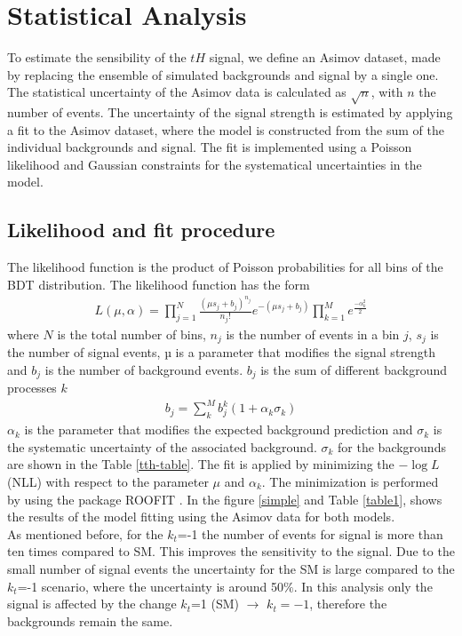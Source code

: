 \chapter{Statistical Analysis}
	To estimate the sensibility of the $tH$ signal, we define an Asimov dataset, made by replacing the ensemble of simulated backgrounds and signal by a single one. The statistical uncertainty of the Asimov data is calculated as $\sqrt{n}$, with $n$ the number of events. The uncertainty of the signal strength is estimated by applying a  fit to the Asimov dataset, where the model
	is constructed from the sum of the individual backgrounds and signal. The fit is implemented using a Poisson likelihood and Gaussian constraints for the systematical uncertainties in the model.
	
	
	\section{Likelihood and fit procedure}
	The likelihood function is the product of Poisson probabilities for all bins of the BDT distribution. The likelihood function has the form
	\begin{align}
		L(\mu,\alpha)=\prod_{j=1}^{N}\frac{(\mu s_j +b_j)^{n_j}}{n_j !}e^{-(\mu s_j+b_j)} \prod_{k=1}^M e^{\frac{-\alpha^2_k}{2}}
	\end{align}
	where $N$ is the total number of bins, $n_j$ is the number of events in a bin $j$,  $s_j$ is the number of signal events, µ is a parameter that modifies the signal strength and  $b_j$ is the number of background events.
	$b_j$ is the sum of different background processes $k$
	\begin{align}
		b_j=\sum_k^M b_j^k(1+ \alpha_k \sigma_k)
	\end{align}
	$\alpha_k$ is the parameter that modifies the expected background prediction and $\sigma_k$ is the systematic uncertainty of the associated background. $\sigma_k$ for the backgrounds are shown in the Table \ref{tth-table}.
	The fit is applied by minimizing the $-\log{L}$ (NLL) with respect to the parameter $\mu$ and $\alpha_k$. The minimization is performed by using the package ROOFIT \cite{roofit}. In the figure \ref{simple} and Table \ref{table1}, shows the results of the model fitting using the Asimov data for both models.  \\
	As mentioned before, for the $k_t$=-1 the number of events for signal is more than ten times compared to SM. This improves the sensitivity to the signal. Due to the small number of signal events the uncertainty for the SM is large compared to the $k_t$=-1 scenario, where the uncertainty is around 50$\%$. In this analysis only the signal is affected by the change $k_t$=1 (SM) $\rightarrow$  $k_t=-1$, therefore the backgrounds remain the same.
	
